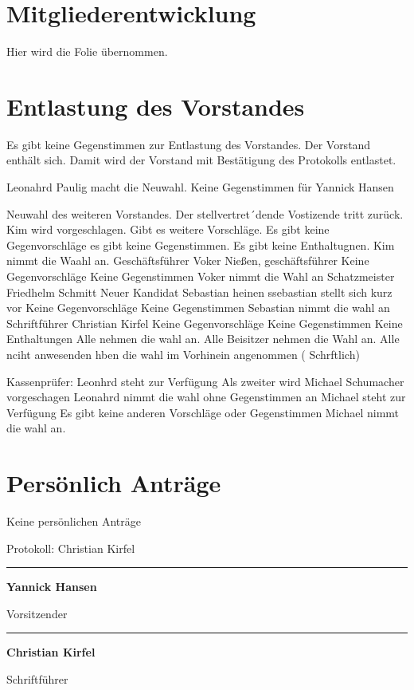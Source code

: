 \documentclass[a4paper, 11pt]{article}
\newcommand\signature[2]{%
\noindent\begin{minipage}{5cm}
    \noindent\vspace{3cm}\par
    \noindent\rule{5cm}{1pt}\par
    \noindent\textbf{#1}\par
    \noindent#2%
\end{minipage}}
\begin{document}
\section*{Mitgliederentwicklung}

Hier wird die Folie übernommen.

\section*{Entlastung des Vorstandes}

Es gibt keine Gegenstimmen zur Entlastung des Vorstandes. Der Vorstand enthält sich. Damit wird der Vorstand mit Bestätigung des Protokolls entlastet.

Leonahrd Paulig macht die Neuwahl.
Keine Gegenstimmen für Yannick Hansen

Neuwahl des weiteren Vorstandes.
Der stellvertret´dende Vostizende tritt zurück.
Kim wird vorgeschlagen. Gibt es weitere Vorschläge.
Es gibt keine Gegenvorschläge
es gibt keine Gegenstimmen.
Es gibt keine Enthaltugnen.
Kim nimmt die Waahl an.
Geschäftsführer Voker Nießen, geschäftsführer
Keine Gegenvorschläge
Keine Gegenstimmen
Voker nimmt die Wahl an
Schatzmeister Friedhelm Schmitt
Neuer Kandidat Sebastian heinen
ssebastian stellt sich kurz vor
Keine Gegenvorschläge
Keine Gegenstimmen
Sebastian nimmt die wahl an
Schriftführer Christian Kirfel
Keine Gegenvorschläge
Keine Gegenstimmen
Keine Enthaltungen
Alle nehmen die wahl an.
Alle Beisitzer nehmen die Wahl an.
Alle nciht anwesenden hben die wahl im Vorhinein angenommen ( Schrftlich)


Kassenprüfer:
Leonhrd steht zur Verfügung
Als zweiter wird Michael Schumacher vorgeschagen
Leonahrd nimmt die wahl ohne Gegenstimmen an
Michael steht zur Verfügung
Es gibt keine anderen Vorschläge oder Gegenstimmen
Michael nimmt die wahl an.

\section*{Persönlich Anträge}

Keine persönlichen Anträge


\newpage

Protokoll: Christian Kirfel


\signature{Yannick Hansen}{Vorsitzender}\hfill\signature{Christian Kirfel}{Schriftführer}
\end{document}
